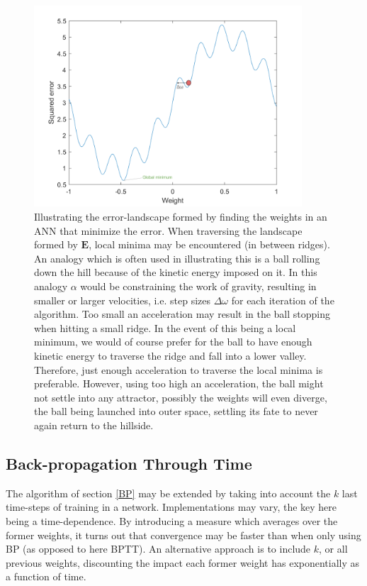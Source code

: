 \begin{figure}
\centering
\includegraphics[width=10cm]{fig/error_landscape_with_ball.png}
\caption{Illustrating the error-landscape formed by finding the weights in an ANN that minimize the error. When traversing the landscape formed by $\textbf{E}$, local minima may be encountered (in between ridges). An analogy which is often used in illustrating this is a ball rolling down the hill because of the kinetic energy imposed on it. In this analogy $\alpha$ would be constraining the work of gravity, resulting in smaller or larger velocities, i.e. step sizes $\Delta \omega$ for each iteration of the algorithm.
Too small an acceleration may result in the ball stopping when hitting a small ridge. In the event of this being a local minimum, we would of course prefer for the ball to have enough kinetic energy to traverse the ridge and fall into a lower valley. Therefore, just enough acceleration to traverse the local minima is preferable. However, using too high an acceleration, the ball might not settle into any attractor, possibly the weights will even diverge, the ball being launched into outer space, settling its fate to never again return to the hillside.}
\label{fig:steepest_descent}
\end{figure}

\subsection{Back-propagation Through Time}

The algorithm of section \ref{BP} may be extended by taking into account the $k$ last time-steps of training in a network. Implementations may vary, the key here being a time-dependence. By introducing a measure which averages over the former weights, it turns out that convergence may be faster than when only using BP (as opposed to here BPTT). An alternative approach is to include $k$, or all previous weights, discounting the impact each former weight has exponentially as a function of time.

